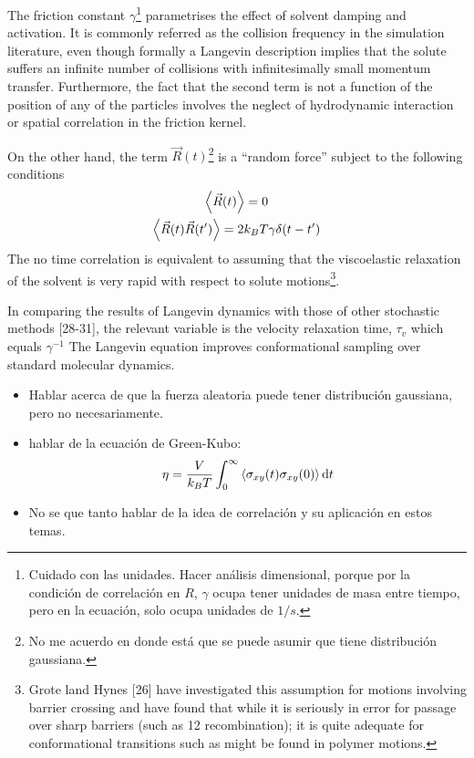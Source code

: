 The friction constant $\gamma$\footnote{Cuidado con las unidades. Hacer análisis dimensional, porque por la condición de correlación en $R$, $\gamma$ ocupa tener unidades de masa entre tiempo, pero en la ecuación, solo ocupa unidades de $1/s$.} parametrises the effect of solvent damping and activation.
It is commonly referred as the collision frequency in the simulation literature, even though formally a Langevin description implies that the solute suffers an infinite number of collisions with infinitesimally small momentum transfer.
Furthermore, the fact that the second term is not a function of the position of any of the particles involves the neglect of hydrodynamic interaction or spatial correlation in the friction kernel\citep{pastorTechniquesApplicationsLangevin1994}.

On the other hand, the term $\vec{R}(t)$\footnote{No me acuerdo en donde está que se puede asumir que tiene distribución gaussiana.} is a ``random force'' subject to the following conditions
\begin{gather}
    \expval{\vec{R}(t)} = 0 \\
    \expval{\vec{R}(t)\vec{R}(t')} = 2k_{B}T\gamma\delta\qty(t-t') 
\end{gather}
The no time correlation is equivalent to assuming that the viscoelastic relaxation of the solvent is very rapid with respect to solute motions\footnote{Grote land Hynes [26] have investigated this assumption for motions involving barrier crossing and have found that while it is seriously in error for passage over sharp barriers (such as 12 recombination); it is quite adequate for conformational transitions such as might be found in polymer motions.\citep{pastorTechniquesApplicationsLangevin1994}}.

In comparing the results of Langevin dynamics with those of other stochastic methods [28-31], the relevant variable is the velocity relaxation time, $\tau_{v}$ which equals $\gamma^{-1}$\citep{pastorTechniquesApplicationsLangevin1994}
The Langevin equation improves conformational sampling over standard molecular dynamics\citep{paquetMolecularDynamicsMonte2015}.

\begin{itemize}
    \item Hablar acerca de que la fuerza aleatoria puede tener distribución gaussiana, pero no necesariamente.
    \item hablar de la ecuación de Green-Kubo: \[\eta=\frac{V}{k_B T}\int_{0}^{\infty}\expval{\sigma_{xy}(t)\sigma_{xy}(0)}\mathrm{d}t\]
    \item No se que tanto hablar de la idea de correlación y su aplicación en estos temas.
\end{itemize}

